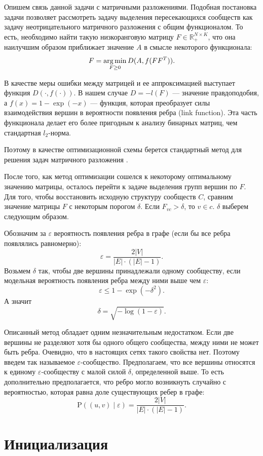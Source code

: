 \documentclass{ITaSconf}
\newcommand{\argmin}{\mathop{\rm arg\,min}\limits}
\def\PP{\mathrm{P}}
\begin{document}
	Опишем связь данной задачи с матричными разложениями.
	Подобная постановка задачи позволяет рассмотреть задачу выделения пересекающихся сообществ как задачу неотрицательного матричного разложения с общим функционалом.
	То есть, необходимо найти такую низкоранговую матрицу $F\in \mathbb{R}_{+}^{N \times K}$, что она наилучшим образом приближает значение $A$ в смысле некоторого функционала:
	$$ F = \argmin_{F\ge 0} D(A, f(F F^T)). $$
	
	В качестве меры ошибки между матрицей и ее аппроксимацией выступает функция $D(\cdot, f(\cdot))$. В нашем случае
	$D = -l(F)$ --- значение правдоподобия, а $f(x) = 1 - \exp(-x)$ --- функция, которая преобразует силы взаимодействия вершин в вероятности появления ребра (link function). Эта часть функционала делает его более пригодным к анализу бинарных матриц, чем стандартная $l_2$-норма.
	
	Поэтому в качестве оптимизационной схемы берется стандартный метод для решения задач матричного разложения \cite{lin2007projected}.
	
	После того, как метод оптимизации сошелся к некоторому оптимальному значению матрицы, осталось перейти к задаче выделения групп вершин по $F$.
	Для того, чтобы восстановить исходную структуру сообществ $C$, сравним значение матрицы $F$ с некоторым порогом $\delta$. Если $F_{vc} > \delta$, то $v \in c$. $\delta$ выберем следующим образом.
	
	Обозначим за $\varepsilon$ вероятность появления ребра в графе (если бы все ребра появлялись равномерно): 
	$$\varepsilon = \dfrac{2|V|}{|E|\cdot (|E|-1)}.$$ 
	Возьмем $\delta$ так, чтобы две вершины принадлежали одному сообществу, если модельная вероятность появления ребра между ними выше чем $\varepsilon$:
	$$\varepsilon \le 1-\exp(-\delta^2).$$
	А значит
	$$\delta = \sqrt{-\log(1-\varepsilon)}. $$
	
	Описанный метод обладает одним незначительным недостатком.
	Если две вершины не разделяют хотя бы одного общего сообщества, между ними не может быть ребра.  
	Очевидно, что в настоящих сетях такого свойства нет.
	Поэтому введем так называемое $\varepsilon$-сообщество.
	Предполагаем, что все вершины относятся к единому $\varepsilon$-сообществу с малой силой $\delta$, определенной выше.
	То есть дополнительно предполагается, что ребро могло возникнуть случайно с вероятностью, которая равна доле существующих ребер в графе:
	$$ \PP((u,v)\mid \varepsilon) = \dfrac{2|V|}{|E| \cdot \left( |E| - 1 \right)}.$$
	
	\section{Инициализация}
	
\end{document}

